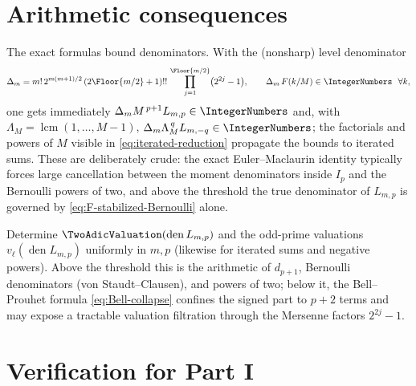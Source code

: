 \documentclass[11pt,oneside]{article}
\numberwithin{equation}{section}
\theoremstyle{definition}
\theoremstyle{remark}
\begin{document}
\section{Arithmetic consequences}
\label{sec:arithmetic-sums}

The exact formulas bound denominators.  With the (nonsharp) level
denominator
\begin{equation}
 \Delta_m
 =m!\,2^{m(m+1)/2}\,
 (2\Floor{m/2}+1)!!\,
 \prod_{j=1}^{\Floor{m/2}}\bigl(2^{2j}-1\bigr),
 \qquad
 \Delta_m\,F(k/M)\in\IntegerNumbers\ \ \forall k,
 \label{eq:DeltaN}
\end{equation}
one gets immediately $\Delta_mM^{\,p+1}L_{m,p}\in\IntegerNumbers$ and, with
$\Lambda_M=\operatorname{lcm}(1,\dots,M-1)$,
$\Delta_m\Lambda_M^{\,q}L_{m,-q}\in\IntegerNumbers$; the factorials and powers of
$M$ visible in \eqref{eq:iterated-reduction} propagate the bounds to
iterated sums.  These are deliberately crude: the exact
Euler--Maclaurin identity typically forces large cancellation between
the moment denominators inside $I_p$ and the Bernoulli powers of two,
and above the threshold the true denominator of $L_{m,p}$ is governed
by \eqref{eq:F-stabilized-Bernoulli} alone.

\begin{problem}
\label{prob:sharp-valuations}
Determine $\TwoAdicValuation(\operatorname{den}L_{m,p})$ and the odd-prime
valuations $v_\ell(\operatorname{den}L_{m,p})$ uniformly in $m,p$
(likewise for iterated sums and negative powers).  Above the
threshold this is the arithmetic of $d_{p+1}$, Bernoulli
denominators (von Staudt--Clausen), and powers of two; below it, the
Bell--Prouhet formula \eqref{eq:Bell-collapse} confines the signed
part to $p+2$ terms and may expose a tractable valuation filtration
through the Mersenne factors $2^{2j}-1$.
\end{problem}

\section{Verification for Part I}
\label{sec:verification-sums}
\end{document}
